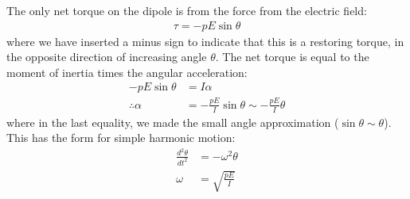 \begin{solution}
The only net torque on the dipole is from the force from the electric field:
\begin{align*}
\tau = -pE\sin\theta 
\end{align*}
where we have inserted a minus sign to indicate that this is a restoring torque, in the opposite direction of increasing angle $\theta$. The net torque is equal to the moment of inertia times the angular acceleration:
\begin{align*}
-pE\sin\theta &= I\alpha\\
\therefore \alpha &= -\frac{pE}{I}\sin\theta\sim-\frac{pE}{I}\theta
\end{align*}
where in the last equality, we made the small angle approximation ($\sin\theta\sim\theta$). This has the form for simple harmonic motion:
\begin{align*}
\frac{d^2\theta}{dt^2}&=-\omega^2 \theta\\
\omega &=\sqrt{\frac{pE}{I}}
\end{align*}
\end{solution}

